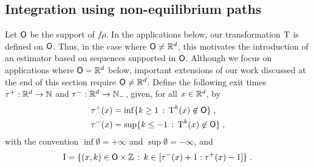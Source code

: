 \documentclass{article}
\begin{document}
\subsection{Integration using non-equilibrium paths} \label{sec:estimator}
Let $\mathsf{O}$ be the support of $f\rho$. In the applications below, our transformation $\operatorname{T}$ is defined on $\mathsf{O}$. Thus,
in the case where $\mathsf{O} \neq \mathbb{R}^d$, this motivates the introduction of an estimator based on sequences supported in $\mathsf{O}$.
Although we focus on applications where $\mathsf{O}=\mathbb{R}^d$ below, important extensions of our work discussed at the end of this section require $\mathsf{O}\neq\mathbb{R}^d$.
Define the following exit times
$\tau^{+} : \mathbb{R}^d \to \mathbb{N}$ and $\tau^{-} : \mathbb{R}^d \to \mathbb{N}_-$, given, for
all $x \in \mathbb{R}^d$, by
\begin{align}
\label{eq:definition-tau-+--}
&\tau^{+}(x)=\inf\{k\geq 1\, :  \,  \operatorname{T}^{k}(x) \not \in \mathsf{O}\} \;, \\
&\tau^{-}(x)=\sup\{k\leq -1\, :  \,  \operatorname{T}^{k}(x) \not \in \mathsf{O}\} \;,
\end{align}
with the convention $\inf \emptyset = +\infty$ and
$\sup \emptyset = - \infty$, and
\begin{equation}
  \label{eq:def_rmi}
  \mathrm{I} = \{(x,k) \in \mathsf{O}\times \mathbb{Z}\,:\, k \in
[\tau^-(x)+1:\tau^+(x)-1]\} \;.
\end{equation}
\end{document}
